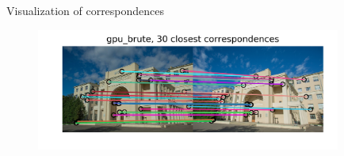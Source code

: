 \documentclass[aspectratio=169]{beamer}
\begin{document}
\begin{frame}{Visualization of correspondences}
\begin{figure}
	\centering
	\begin{minipage}{10.0cm}
		
		\includegraphics[width=10.0cm]{corresp_gpu_brute.png}
	\end{minipage}
	\vfill
\end{figure}
\end{frame}
\fi
\end{document}
